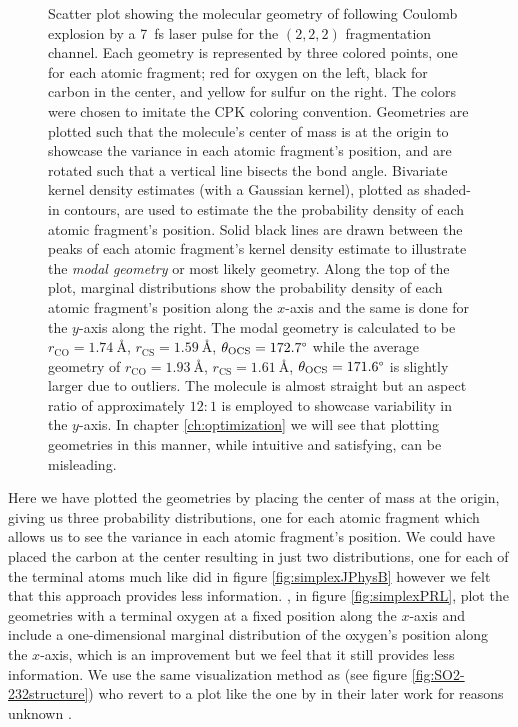 \begin{figure}
  {Scatter plot showing the molecular geometry of  following Coulomb explosion by a \SI{7}{\fs} laser pulse for the $(2,2,2)$ fragmentation channel. Each geometry is represented by three colored points, one for each atomic fragment; red for oxygen on the left, black for carbon in the center, and yellow for sulfur on the right. The colors were chosen to imitate the CPK coloring convention. Geometries are plotted such that the molecule's center of mass is at the origin to showcase the variance in each atomic fragment's position, and are rotated such that a vertical line bisects the  bond angle. Bivariate kernel density estimates (with a Gaussian kernel), plotted as shaded-in contours, are used to estimate the the probability density of each atomic fragment's position. Solid black lines are drawn between the peaks of each atomic fragment's kernel density estimate to illustrate the \emph{modal geometry} or most likely geometry. Along the top of the plot, marginal distributions show the probability density of each atomic fragment's position along the $x$-axis and the same is done for the $y$-axis along the right. The modal geometry is calculated to be $r_\mathrm{CO} = \SI{1.74}{\angstrom}$, $r_\mathrm{CS} = \SI{1.59}{\angstrom}$, $ \theta_\mathrm{OCS} = 172.7\degree$ while the average geometry of $r_\mathrm{CO} = \SI{1.93}{\angstrom}$, $r_\mathrm{CS} = \SI{1.61}{\angstrom}$, $ \theta_\mathrm{OCS} = 171.6\degree$ is slightly larger due to outliers. The molecule is almost straight but an aspect ratio of approximately $12:1$ is employed to showcase variability in the $y$-axis. In chapter \ref{ch:optimization} we will see that plotting geometries in this manner, while intuitive and satisfying, can be misleading.}
  \label{fig:OCS2227fsLTGeometry}
\end{figure}

Here we have plotted the geometries by placing the center of mass at the origin, giving us three probability distributions, one for each atomic fragment which allows us to see the variance in each atomic fragment's position. We could have placed the carbon at the center resulting in just two distributions, one for each of the terminal atoms much like \citet{Brichta07} did in figure \ref{fig:simplexJPhysB} however we felt that this approach provides less information. \cite{Bocharova11}, in figure \ref{fig:simplexPRL}, plot the geometries with a terminal oxygen at a fixed position along the $x$-axis and include a one-dimensional marginal distribution of the oxygen's position along the $x$-axis, which is an improvement but we feel that it still provides less information.  We use the same visualization method as \citet{Legare05structure} (see figure \ref{fig:SO2-232structure}) who revert to a plot like the one by \citet{Bocharova11} in their later work for reasons unknown \citep{Legare05dynamics}.

